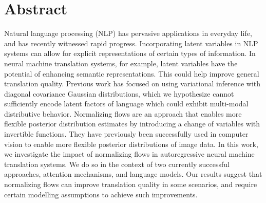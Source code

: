 
\chapter{Abstract}

Natural language processing (NLP) has pervasive applications in everyday life, and has recently witnessed rapid progress. Incorporating latent variables in NLP systems can allow for explicit representations of certain types of information. In neural machine translation systems, for example, latent variables have the potential of enhancing semantic representations. This could help improve general translation quality. Previous work has focused on using variational inference with diagonal covariance Gaussian distributions, which we hypothesize cannot sufficiently encode latent factors of language which could exhibit multi-modal distributive behavior. Normalizing flows are an approach that enables more flexible posterior distribution estimates by introducing a change of variables with invertible functions. They have previously been successfully used in computer vision to enable more flexible posterior distributions of image data. In this work, we investigate the impact of normalizing flows in autoregressive neural machine translation systems. We do so in the context of two currently successful approaches, attention mechanisms, and language models. Our results suggest that normalizing flows can improve translation quality in some scenarios, and require certain modelling assumptions to achieve such improvements.


